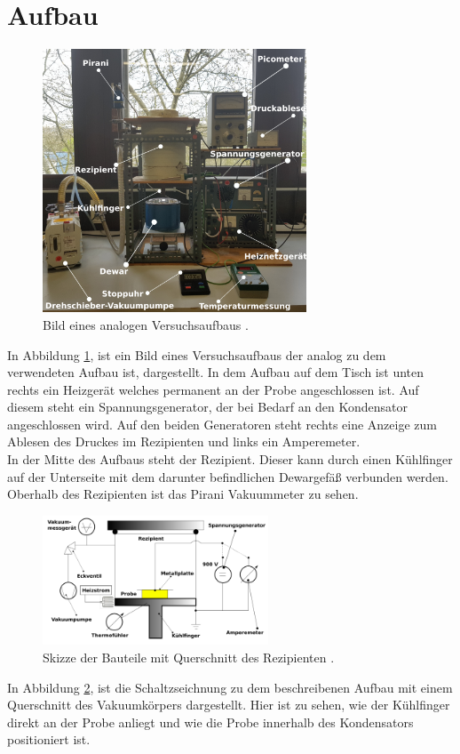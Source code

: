 \newpage
\section{Aufbau}
	\begin{figure}
        \centering
        \includegraphics[width = 0.7\textwidth]{latex/images/Aufbau2.png}
        \caption{Bild eines analogen Versuchsaufbaus \cite{V48}.}
        \label{fig:Aufb2}
    \end{figure}
    \noindent
    In Abbildung \ref{fig:Aufb2}, ist ein Bild eines Versuchsaufbaus der analog zu dem verwendeten Aufbau ist, dargestellt. 
    In dem Aufbau auf dem Tisch ist unten rechts ein Heizgerät welches permanent an der Probe angeschlossen ist.
    Auf diesem steht ein Spannungsgenerator, der bei Bedarf an den Kondensator angeschlossen wird.
    Auf den beiden Generatoren steht rechts eine Anzeige zum Ablesen des Druckes im Rezipienten und links ein Amperemeter.\\
    In der Mitte des Aufbaus steht der Rezipient. 
	Dieser kann durch einen Kühlfinger auf der Unterseite mit dem darunter befindlichen Dewargefäß verbunden werden.
    Oberhalb des Rezipienten ist das Pirani Vakuummeter zu sehen.
	\begin{figure}
		\centering
		\includegraphics[width = 0.6\textwidth]{latex/images/Aufbau3.png}
		\caption{Skizze der Bauteile mit Querschnitt des Rezipienten \cite{V48}.}
		\label{fig:Aufb3}
	\end{figure}
	In Abbildung \ref{fig:Aufb3}, ist die Schaltzseichnung zu dem beschreibenen Aufbau mit einem Querschnitt des Vakuumkörpers dargestellt. 
	Hier ist zu sehen, wie der Kühlfinger direkt an der Probe anliegt und wie die Probe innerhalb des Kondensators positioniert ist.
     
